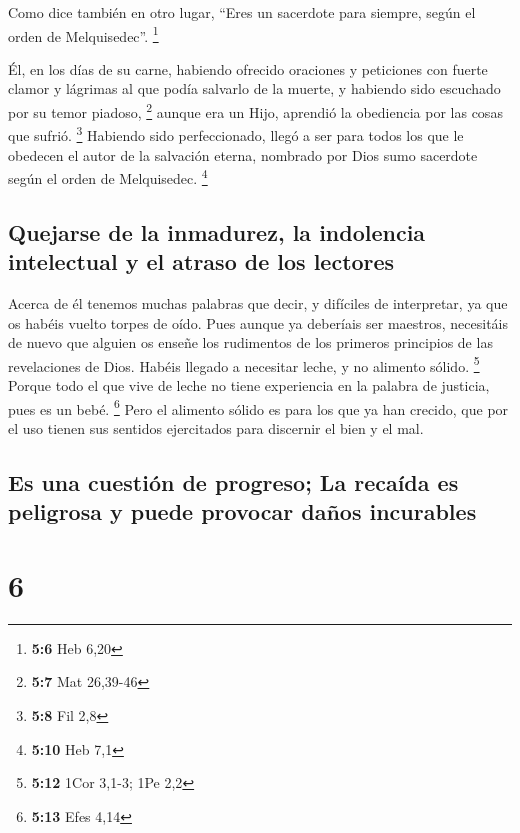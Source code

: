  Como dice también en otro lugar, ``Eres un sacerdote para
siempre, según el orden de Melquisedec''. \footnote{\textbf{5:6} Heb
  6,20}

 Él, en los días de su carne, habiendo ofrecido oraciones
y peticiones con fuerte clamor y lágrimas al que podía salvarlo de la
muerte, y habiendo sido escuchado por su temor piadoso, \footnote{\textbf{5:7}
  Mat 26,39-46}  aunque era un Hijo, aprendió la
obediencia por las cosas que sufrió. \footnote{\textbf{5:8} Fil 2,8}
 Habiendo sido perfeccionado, llegó a ser para todos los
que le obedecen el autor de la salvación eterna, 
nombrado por Dios sumo sacerdote según el orden de Melquisedec.
\footnote{\textbf{5:10} Heb 7,1}

\hypertarget{quejarse-de-la-inmadurez-la-indolencia-intelectual-y-el-atraso-de-los-lectores}{%
\subsection{Quejarse de la inmadurez, la indolencia intelectual y el
atraso de los
lectores}\label{quejarse-de-la-inmadurez-la-indolencia-intelectual-y-el-atraso-de-los-lectores}}

 Acerca de él tenemos muchas palabras que decir, y
difíciles de interpretar, ya que os habéis vuelto torpes de oído.
 Pues aunque ya deberíais ser maestros, necesitáis de
nuevo que alguien os enseñe los rudimentos de los primeros principios de
las revelaciones de Dios. Habéis llegado a necesitar leche, y no
alimento sólido. \footnote{\textbf{5:12} 1Cor 3,1-3; 1Pe 2,2}
 Porque todo el que vive de leche no tiene experiencia en
la palabra de justicia, pues es un bebé. \footnote{\textbf{5:13} Efes
  4,14}  Pero el alimento sólido es para los que ya han
crecido, que por el uso tienen sus sentidos ejercitados para discernir
el bien y el mal.

\hypertarget{es-una-cuestiuxf3n-de-progreso-la-recauxedda-es-peligrosa-y-puede-provocar-dauxf1os-incurables}{%
\subsection{Es una cuestión de progreso; La recaída es peligrosa y puede
provocar daños
incurables}\label{es-una-cuestiuxf3n-de-progreso-la-recauxedda-es-peligrosa-y-puede-provocar-dauxf1os-incurables}}

\hypertarget{section-5}{%
\section{6}\label{section-5}}

